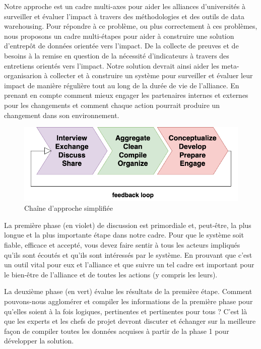 Notre approche est un cadre multi-axes pour aider les alliances d'universités à surveiller et évaluer l'impact à travers des méthodologies et des outils de data warehousing. Pour répondre à ce problème, ou plus correctement à ces problèmes, nous proposons un cadre multi-étapes pour aider à construire une solution d'entrepôt de données orientée vers l'impact. De la collecte de preuves et de besoins à la remise en question de la nécessité d'indicateurs à travers des entretiens orientés vers l'impact. Notre solution devrait ainsi aider les meta-organisarion à collecter et à construire un système pour surveiller et évaluer leur impact de manière régulière tout au long de la durée de vie de l'alliance. En prenant en compte comment mieux engager les partenaires internes et externes pour les changements et comment chaque action pourrait produire un changement dans son environnement.

\begin{figure}[h]
    \centering
    \includegraphics[width=1\linewidth]{Modele_Latex_CNRIUT2025//images/Diagrams-Simplified framework chain Our approach.drawio.png}
    \caption{Chaîne d'approche simplifiée}
    \label{fig:approach-simplified}
\end{figure}

La première phase (en violet) de discussion est primordiale et, peut-être, la plus longue et la plus importante étape dans notre cadre. Pour que le système soit fiable, efficace et accepté, vous devez faire sentir à tous les acteurs impliqués qu'ils sont écoutés et qu'ils sont intéressés par le système. En prouvant que c'est un outil vital pour eux et l'alliance et que suivre un tel cadre est important pour le bien-être de l'alliance et de toutes les actions (y compris les leurs).

La deuxième phase (en vert) évalue les résultats de la première étape. Comment pouvons-nous agglomérer et compiler les informations de la première phase pour qu'elles soient à la fois logiques, pertinentes et pertinentes pour tous ? C'est là que les experts et les chefs de projet devront discuter et échanger sur la meilleure façon de compiler toutes les données acquises à partir de la phase 1 pour développer la solution.

